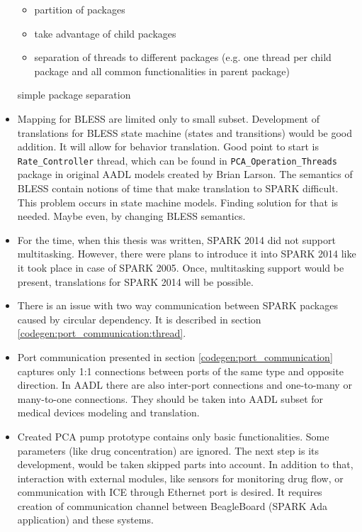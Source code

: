 \begin{itemize}
		\begin{itemize}
			\item partition of packages
			\item take advantage of child packages
			\item separation of threads to different packages (e.g. one thread per child package and all common functionalities in parent package)
		\end{itemize} simple package separation
	\item Mapping for BLESS are limited only to small subset. Development of translations for BLESS state machine (states and transitions) would be good addition. It will allow for behavior translation. Good point to start is \lstinline{Rate_Controller} thread, which can be found in \lstinline{PCA_Operation_Threads} package in original AADL models created by Brian Larson. The semantics of BLESS contain notions of time that make translation to SPARK difficult. This problem occurs in state machine models. Finding solution for that is needed. Maybe even, by changing BLESS semantics.
	\item For the time, when this thesis was written, SPARK 2014 did not support multitasking. However, there were plans to introduce it into SPARK 2014 like it took place in case of SPARK 2005. Once, multitasking support would be present, translations for SPARK 2014 will be possible.
	\item There is an issue with two way communication between SPARK packages caused by circular dependency. It is described in section \ref{codegen:port_communication:thread}.
	\item Port communication presented in section \ref{codegen:port_communication} captures only 1:1 connections between ports of the same type and opposite direction. In AADL there are also inter-port connections and one-to-many or many-to-one connections. \cite{AadlBook} They should be taken into AADL subset for medical devices modeling and translation. 
	\item Created PCA pump prototype contains only basic functionalities. Some parameters (like drug concentration) are ignored. The next step is its development, would be taken skipped parts into account. In addition to that, interaction with external modules, like sensors for monitoring drug flow, or communication with ICE through Ethernet port is desired. It requires creation of communication channel 	between BeagleBoard (SPARK Ada application) and these systems. 	
\end{itemize}
